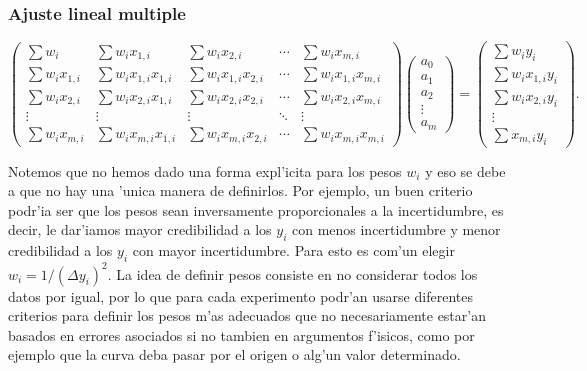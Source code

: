 \documentclass[a4paper]{report}
\begin{document}
\subsubsection{Ajuste lineal multiple}
\begin{equation}
\left(\begin{array}{ccccc}
\sum w_{i} & \sum w_{i}x_{1,i} & \sum w_{i}x_{2,i} & \cdots &  \sum w_{i}x_{m,i} \\
\sum w_{i}x_{1,i} & \sum w_{i}x_{1,i}x_{1,i} & \sum w_{i}x_{1,i}x_{2,i} &\cdots & \sum w_{i}x_{1,i}x_{m,i}  \\
\sum w_{i}x_{2,i} & \sum w_{i}x_{2,i}x_{1,i} & \sum w_{i}x_{2,i}x_{2,i} &\cdots & \sum w_{i}x_{2,i}x_{m,i}  \\
\vdots & \vdots  & \vdots & \ddots & \vdots \\
\sum w_{i}x_{m,i} & \sum w_{i}x_{m,i}x_{1,i} & \sum w_{i}x_{m,i}x_{2,i} &\cdots & \sum w_{i}x_{m,i}x_{m,i} 
\end{array}\right)
\left(\begin{array}{c} a_0\\a_1\\a_2\\ \vdots \\ a_m\end{array}\right)
=
\left(\begin{array}{c} \sum w_{i}y_i\\\sum w_{i}x_{1,i}y_i\\\sum w_{i}x_{2,i}y_i \\\vdots\\ \sum x_{m,i}y_i\end{array}\right).
\end{equation}

Notemos que no hemos dado una forma expl'icita para los pesos $w_{i}$ y eso se debe a que no hay una 'unica manera de definirlos. Por ejemplo, un buen criterio podr'ia ser que los pesos sean inversamente proporcionales a la incertidumbre, es decir, le dar'iamos mayor credibilidad a los $y_{i}$ con menos incertidumbre y menor credibilidad a los $y_{i}$ con mayor incertidumbre. Para esto es com'un elegir  $w_{i}=1/(\Delta y_{i})^2$. La idea de definir pesos consiste en no considerar todos los datos por igual, por lo que para cada experimento podr'an usarse diferentes criterios para definir los pesos m'as adecuados que no necesariamente estar'an basados en errores asociados si no tambien en argumentos f'isicos, como por ejemplo que la curva deba pasar por el origen o alg'un valor determinado. 
\end{document}
